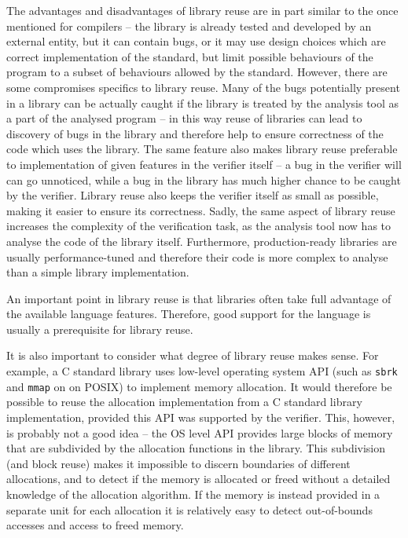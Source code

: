 The advantages and disadvantages of library reuse are in part similar to the
once mentioned for compilers -- the library is already tested and developed by
an external entity, but it can contain bugs, or it may use design choices which
are correct implementation of the standard, but limit possible behaviours of
the program to a subset of behaviours allowed by the standard.
However, there are some compromises specifics to library reuse.
Many of the bugs potentially present in a library can be actually caught if the
library is treated by the analysis tool as a part of the analysed program -- in
this way reuse of libraries can lead to discovery of bugs in the library and
therefore help to ensure correctness of the code which uses the
library.
The same feature also makes library reuse preferable to implementation of given features in the verifier itself -- a bug in the verifier will can go unnoticed, while a bug in the library has much higher chance to be caught by the verifier.
Library reuse also keeps the verifier itself as small as possible, making it easier to ensure its correctness.
Sadly, the same aspect of library reuse increases the complexity of the verification task, as the analysis tool now has to analyse the code of the library itself.
Furthermore, production-ready libraries are usually performance-tuned and therefore their code is more complex to analyse than a simple library implementation.

An important point in library reuse is that libraries often take full advantage of the available language features.
Therefore, good support for the language is usually a prerequisite for library reuse.

It is also important to consider what degree of library reuse makes sense.
For example, a C standard library uses low-level operating system API (such as
\texttt{sbrk} and \texttt{mmap} on on POSIX) to implement memory allocation.
It would therefore be possible to reuse the allocation implementation from a C
standard library implementation, provided this API was supported by the
verifier.
This, however, is probably not a good idea -- the OS level API provides large blocks of memory that are subdivided by the allocation functions in the library.
This subdivision (and block reuse) makes it impossible to discern boundaries of different allocations, and to detect if the memory is allocated or freed without a detailed knowledge of the allocation algorithm.
If the memory is instead provided in a separate unit for each allocation it is relatively easy to detect out-of-bounds accesses and access to freed memory.

